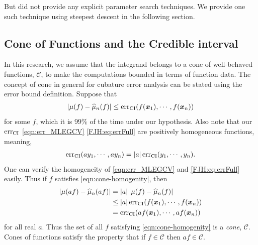 \documentclass{svjour3}                     %
\newcommand{\bm}[1]{\boldsymbol{#1}}
\newcommand{\vx}{\bm{x}}
\newcommand{\hmu}{\widehat{\mu}}
\newcommand{\CI}{\textup{CI}}
\newcommand{\NICE}{\textup{nice}}
\newcommand{\err}{\textup{err}}
\def\abs#1{\ensuremath{\left \lvert #1 \right \rvert}}
\newcommand{\JRNote}[1]{{\textcolor{green}{JR: #1}}}
\begin{document}
But \cite{JagHic19a} did not provide any explicit parameter search techniques. We provide one such technique using steepest descent in the following section. 























\subsection{Cone of Functions and the Credible interval} %
\label{sec:cone_of_functions}


In this research, we assume that the integrand belongs to a cone of well-behaved functions, $\mathscr{C}$, to make the computations bounded in terms of function data. The concept of cone in general for cubature error analysis can be stated using the error bound definition. 
Suppose that 
\begin{align}
\label{eqn:cone-homogenity}
\abs{\mu(f) - \hmu_n(f)} \le \err_{\CI} (f(\vx_1), \cdots, f(\vx_n))
\end{align}
for some $f$, which it is 99\% of the time under our hypothesis. Also note that our $\err_{\CI}$ \eqref{eqn:err_MLEGCV} \eqref{FJH:eq:errFull} are positively homogeneous functions, meaning, 
\begin{align*}
\err_{\CI} (a y_1, \cdots, a y_n) = \abs{a} \err_{\CI} ( y_1, \cdots,  y_n).
\end{align*}
One can verify the homogeneity of \eqref{eqn:err_MLEGCV} and \eqref{FJH:eq:errFull} easily.
Thus if $f$ satisfies \eqref{eqn:cone-homogenity}, then
\begin{align*}
\abs{\mu(af) - \hmu_n(af)} &= \abs{a} \abs{\mu(f) - \hmu_n(f)} \\
& \le \abs{a} \err_{\CI} (f(\vx_1), \cdots, f(\vx_n) ) \\
& = \err_{\CI} (a f(\vx_1), \cdots, a f(\vx_n))
\end{align*}
for all real $a$. Thus the set of all $f$ satisfying \eqref{eqn:cone-homogenity} is a \emph{cone}, $\mathscr{C}$. Cones of functions satisfy the property that if $f \in \mathscr{C}$ then $af \in \mathscr{C}$.
\end{document}
